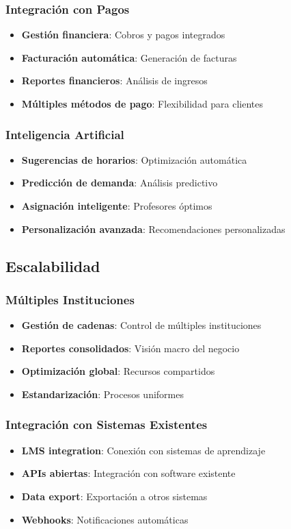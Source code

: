 \documentclass[12pt,a4paper]{article}
\begin{document}
\subsubsection{Integración con Pagos}
\begin{itemize}
    \item \textbf{Gestión financiera}: Cobros y pagos integrados
    \item \textbf{Facturación automática}: Generación de facturas
    \item \textbf{Reportes financieros}: Análisis de ingresos
    \item \textbf{Múltiples métodos de pago}: Flexibilidad para clientes
\end{itemize}

\subsubsection{Inteligencia Artificial}
\begin{itemize}
    \item \textbf{Sugerencias de horarios}: Optimización automática
    \item \textbf{Predicción de demanda}: Análisis predictivo
    \item \textbf{Asignación inteligente}: Profesores óptimos
    \item \textbf{Personalización avanzada}: Recomendaciones personalizadas
\end{itemize}

\subsection{Escalabilidad}

\subsubsection{Múltiples Instituciones}
\begin{itemize}
    \item \textbf{Gestión de cadenas}: Control de múltiples instituciones
    \item \textbf{Reportes consolidados}: Visión macro del negocio
    \item \textbf{Optimización global}: Recursos compartidos
    \item \textbf{Estandarización}: Procesos uniformes
\end{itemize}

\subsubsection{Integración con Sistemas Existentes}
\begin{itemize}
    \item \textbf{LMS integration}: Conexión con sistemas de aprendizaje
    \item \textbf{APIs abiertas}: Integración con software existente
    \item \textbf{Data export}: Exportación a otros sistemas
    \item \textbf{Webhooks}: Notificaciones automáticas
\end{itemize}
\end{document}
